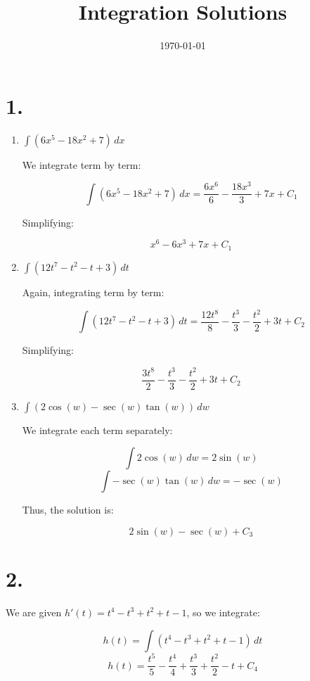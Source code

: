 \documentclass{article}
\title{Integration Solutions}
\author{}
\date{\today}
\begin{document}
\maketitle
\thispagestyle{fancy}

\section*{1.}

\begin{enumerate}

\item \(\int \left( 6x^5 - 18x^2 + 7 \right) \, dx\)

We integrate term by term:

\[
\int \left( 6x^5 - 18x^2 + 7 \right) \, dx = \frac{6x^6}{6} - \frac{18x^3}{3} + 7x + C_1
\]

Simplifying:

\[
x^6 - 6x^3 + 7x + C_1
\]

\item \(\int \left( 12t^7 - t^2 - t + 3 \right) \, dt\)

Again, integrating term by term:

\[
\int \left( 12t^7 - t^2 - t + 3 \right) \, dt = \frac{12t^8}{8} - \frac{t^3}{3} - \frac{t^2}{2} + 3t + C_2
\]

Simplifying:

\[
\frac{3t^8}{2} - \frac{t^3}{3} - \frac{t^2}{2} + 3t + C_2
\]

\item \(\int \left( 2 \cos(w) - \sec(w) \tan(w) \right) \, dw\)

We integrate each term separately:

\[
\int 2 \cos(w) \, dw = 2 \sin(w)
\]
\[
\int - \sec(w) \tan(w) \, dw = - \sec(w)
\]

Thus, the solution is:

\[
2 \sin(w) - \sec(w) + C_3
\]

\end{enumerate}

\section*{2.}

We are given \( h'(t) = t^4 - t^3 + t^2 + t - 1 \), so we integrate:

\[
h(t) = \int \left( t^4 - t^3 + t^2 + t - 1 \right) \, dt
\]
\[
h(t) = \frac{t^5}{5} - \frac{t^4}{4} + \frac{t^3}{3} + \frac{t^2}{2} - t + C_4
\]
\end{document}
